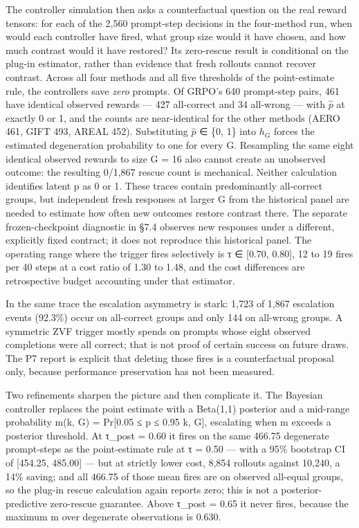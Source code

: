 \documentclass[12pt,a4paper]{report}
\begin{document}
The controller simulation then asks a counterfactual question on the
real reward tensors: for each of the 2,560 prompt-step decisions in the
four-method run, when would each controller have fired, what group size
would it have chosen, and how much contrast would it have restored? Its
zero-rescue result is conditional on the plug-in estimator, rather than
evidence that fresh rollouts cannot recover contrast. Across all four
methods and all five thresholds of the point-estimate rule, the
controllers save \emph{zero} prompts. Of GRPO's 640 prompt-step pairs,
461 have identical observed rewards --- 427 all-correct and 34 all-wrong
--- with \ensuremath{\hat{p}} at exactly 0 or 1, and the counts are near-identical for the
other methods (AERO 461, GIFT 493, AREAL 452). Substituting \ensuremath{\hat{p}} ∈ \{0, 1\}
into \(h_G\) forces the estimated degeneration probability to one for
every G. Resampling the same eight identical observed rewards to size G
= 16 also cannot create an unobserved outcome: the resulting 0/1,867
rescue count is mechanical. Neither calculation identifies latent p as 0
or 1. These traces contain predominantly all-correct groups, but
independent fresh responses at larger G from the historical panel are
needed to estimate how often new outcomes restore contrast there. The
separate frozen-checkpoint diagnostic in §7.4 observes new responses
under a different, explicitly fixed contract; it does not reproduce this
historical panel. The operating range where the trigger fires
selectively is τ ∈ {[}0.70, 0.80{]}, 12 to 19 fires per 40 steps at a
cost ratio of 1.30 to 1.48, and the cost differences are retrospective
budget accounting under that estimator.

In the same trace the escalation asymmetry is stark: 1,723 of 1,867
escalation events (92.3\%) occur on all-correct groups and only 144 on
all-wrong groups. A symmetric ZVF trigger mostly spends on prompts whose
eight observed completions were all correct; that is not proof of
certain success on future draws. The P7 report is explicit that deleting
those fires is a counterfactual proposal only, because performance
preservation has not been measured.

Two refinements sharpen the picture and then complicate it. The Bayesian
controller replaces the point estimate with a Beta(1,1) posterior and a
mid-range probability m(k, G) = Pr{[}0.05 ≤ p ≤ 0.95 \textbar{} k, G{]},
escalating when m exceeds a posterior threshold. At τ\_post = 0.60 it
fires on the same 466.75 degenerate prompt-steps as the point-estimate
rule at τ = 0.50 --- with a 95\% bootstrap CI of {[}454.25, 485.00{]}
--- but at strictly lower cost, 8,854 rollouts against 10,240, a 14\%
saving; and all 466.75 of those mean fires are on observed all-equal
groups, so the plug-in rescue calculation again reports zero; this is
not a posterior-predictive zero-rescue guarantee. Above τ\_post = 0.65
it never fires, because the maximum m over degenerate observations is
0.630.
\end{document}
